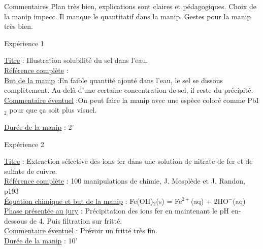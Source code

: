 \begin{reportBlock}{Commentaires}
Plan très bien, explications sont claires et pédagogiques. Choix de la manip impecc. Il manque le quantitatif dans la manip. Gestes pour la manip très bien.

\end{reportBlock}


\begin{reportBlock}{Expérience 1}

\underline{Titre} : Illustration solubilité du sel dans l'eau. \\

\underline{Référence complète} : \\ 

\underline{But de la manip} :En faible quantité ajouté dans l'eau, le sel se dissous complètement. Au-delà d'une certaine concentration de sel, il reste du précipité.\\

\underline{Commentaire éventuel} :On peut faire la manip avec une espèce coloré comme PbI$_2$ pour que ça soit plus visuel.

\underline{Durée de la manip} : 2' \\

\end{reportBlock}



\begin{reportBlock}{Expérience 2}

\underline{Titre} : Extraction sélective des ions fer dans une solution de nitrate de fer et de sulfate de cuivre. \\

\underline{Référence complète} : 100 manipulations de chimie, J. Mesplède et J. Randon, p193 \\ 

\underline{Équation chimique et but de la manip} : Fe(OH)$_2$(s) = Fe$^{2+}$(aq) + 2HO$^-$(aq) \\

\underline{Phase présentée au jury} : Précipitation des ions fer en maintenant le pH en-dessous de 4. Puis filtration sur fritté. \\

\underline{Commentaire éventuel} : Prévoir un fritté très fin.\\

\underline{Durée de la manip} : 10'\\

\end{reportBlock}

